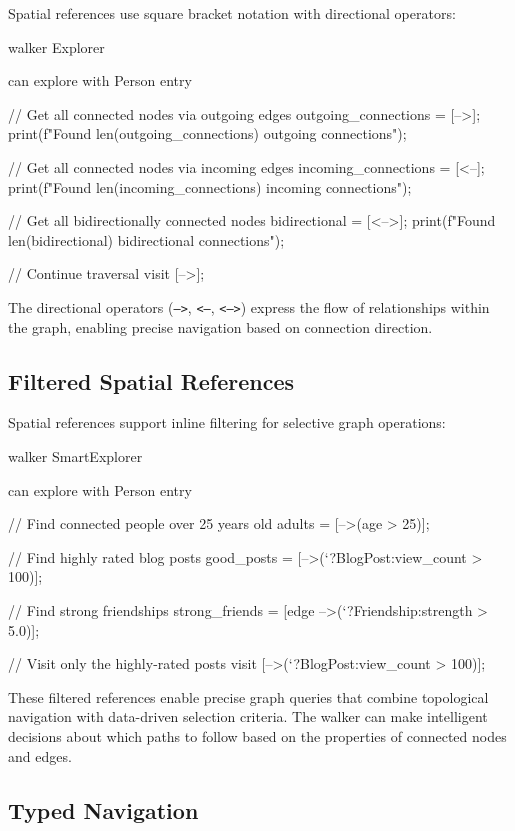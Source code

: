 Spatial references use square bracket notation with directional operators:

\begin{jacblock}
walker Explorer {
    can explore with Person entry {
        // Get all connected nodes via outgoing edges
        outgoing_connections = [-->];
        print(f"Found {len(outgoing_connections)} outgoing connections");

        // Get all connected nodes via incoming edges
        incoming_connections = [<--];
        print(f"Found {len(incoming_connections)} incoming connections");

        // Get all bidirectionally connected nodes
        bidirectional = [<-->];
        print(f"Found {len(bidirectional)} bidirectional connections");

        // Continue traversal
        visit [-->];
    }
}
\end{jacblock}

The directional operators (\texttt{-->}, \texttt{<--}, \texttt{<-->}) express the flow of relationships within the graph, enabling precise navigation based on connection direction.

\subsection{Filtered Spatial References}

Spatial references support inline filtering for selective graph operations:

\begin{jacblock}
walker SmartExplorer {
    can explore with Person entry {
        // Find connected people over 25 years old
        adults = [-->(age > 25)];

        // Find highly rated blog posts
        good_posts = [-->(`?BlogPost:view_count > 100)];

        // Find strong friendships
        strong_friends = [edge -->(`?Friendship:strength > 5.0)];

        // Visit only the highly-rated posts
        visit [-->(`?BlogPost:view_count > 100)];
    }
}
\end{jacblock}

These filtered references enable precise graph queries that combine topological navigation with data-driven selection criteria. The walker can make intelligent decisions about which paths to follow based on the properties of connected nodes and edges.

\subsection{Typed Navigation}

